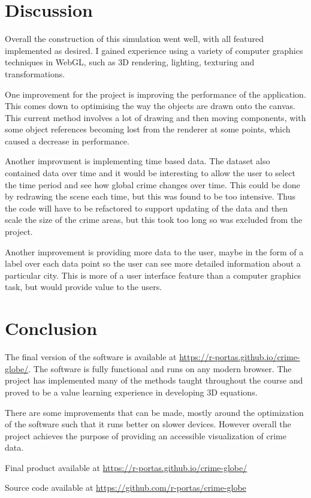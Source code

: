 \documentclass[]{article}
\begin{document}
\section{Discussion}

Overall the construction of this simulation went well,
with all featured implemented as desired.
I gained experience using a variety of computer graphics techniques in WebGL,
such as 3D rendering, lighting, texturing and transformations.

One improvement for the project is improving the performance of the application.
This comes down to optimising the way the objects are drawn onto the canvas.
This current method involves a lot of drawing and then moving components, with
some object references becoming lost from the renderer at some points, which
caused a decrease in performance.

Another improvment is implementing time based data.
The dataset also contained data over time and it would be
interesting to allow the user to select the time period and see how global crime changes over time.
This could be done by redrawing the scene each time, but this was found to be too intensive.
Thus the code will have to be refactored to support updating of the data and then scale the size
of the crime areas, but this took too long so was excluded from the project.

Another improvement is providing more data to the user, maybe in the form of a label over each
data point so the user can see more detailed information about a particular city.
This is more of a user interface feature than a computer graphics task, but would 
provide value to the users.

\section{Conclusion}

The final version of the software is available at \url{https://r-portas.github.io/crime-globe/}.
The software is fully functional and runs on any modern browser.
The project has implemented many of the methods taught throughout the course
and proved to be a value learning experience in developing 3D equations.

There are some improvements that can be made, mostly around the optimization of the software 
such that it runs better on slower devices.
However overall the project achieves the purpose of providing an accessible visualization of crime data.

\break

\begin{large}
    \begin{center}
        Final product available at \url{https://r-portas.github.io/crime-globe/}

        Source code available at \url{https://github.com/r-portas/crime-globe}
    \end{center}
\end{large}



\end{document}

